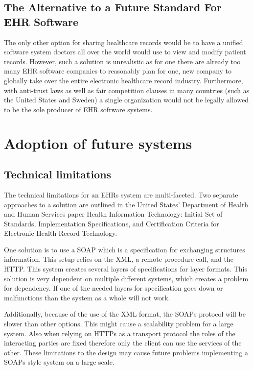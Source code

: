 \documentclass[14pt]{article}
\begin{document}
\subsection{The Alternative to a Future Standard For EHR Software}
The only other option for sharing healthcare records would be to have a unified software system doctors all over the world would use to view and modify patient records. However, such a solution is unrealistic as for one there are already too many \gls{EHR} software companies to reasonably plan for one, new company to globally take over the entire electronic healthcare record industry. Furthermore, with anti-trust laws as well as fair competition clauses in many countries (such as the United States and Sweden) a single organization would not be legally allowed to be the sole producer of \gls{EHR} software systems.



\newpage

\section{Adoption of future systems}
\label{sec:Future}

\subsection{Technical limitations}

The technical limitations for an \glspl{EHR} system are multi-faceted. Two separate approaches to a solution are outlined in the United States’ Department of Health and Human Services paper Health Information Technology: Initial Set of Standards, Implementation Specifications, and Certification Criteria for Electronic Health Record Technology. \cite{AMA} 

One solution is to use a \gls{SOAP} which is a specification for exchanging structures information. This setup relies on the \gls{XML}, a remote procedure call, and the \gls{HTTP}. This system creates several layers of specifications for layer formats. This solution is very dependent on multiple different systems, which creates a problem for dependency. If one of the needed layers for specification goes down or malfunctions than the system as a whole will not work. 

Additionally, because of the use of the \gls{XML} format, the \glspl{SOAP} protocol will be slower than other options. This might cause a scalability problem for a large system. Also when relying on \glspl{HTTP} as a transport protocol the roles of the interacting parties are fixed therefore only the client can use the services of the other. These limitations to the design may cause future problems implementing a \glspl{SOAP} style system on a large scale.
\end{document}
